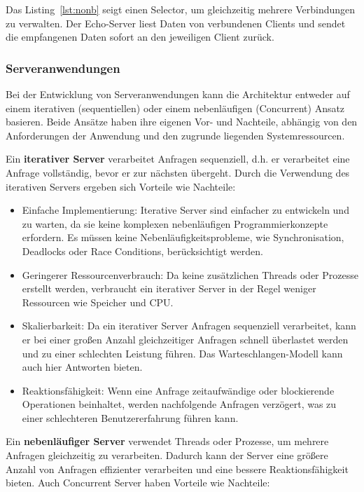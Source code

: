 \documentclass[../vs-script-first-v01.tex]{subfiles}
\begin{document}
Das Listing~\ref{lst:nonb} seigt einen Selector, um gleichzeitig mehrere Verbindungen zu verwalten. Der Echo-Server liest Daten von verbundenen Clients und sendet die empfangenen Daten sofort an den jeweiligen Client zurück.

\subsubsection{Serveranwendungen}
Bei der Entwicklung von Serveranwendungen kann die Architektur entweder auf einem iterativen (sequentiellen) oder einem nebenläufigen (Concurrent) Ansatz basieren. Beide Ansätze haben ihre eigenen Vor- und Nachteile, abhängig von den Anforderungen der Anwendung und den zugrunde liegenden Systemressourcen. 

Ein \textbf{iterativer Server} verarbeitet Anfragen sequenziell, d.h. er verarbeitet eine Anfrage vollständig, bevor er zur nächsten übergeht.  Durch die Verwendung des iterativen Servers ergeben sich Vorteile wie Nachteile:
\begin{itemize}
\item Einfache Implementierung: Iterative Server sind einfacher zu entwickeln und zu warten, da sie keine komplexen nebenläufigen Programmierkonzepte erfordern. Es müssen keine Nebenläufigkeitsprobleme, wie Synchronisation, Deadlocks oder Race Conditions, berücksichtigt werden.
\item Geringerer Ressourcenverbrauch: Da keine zusätzlichen Threads oder Prozesse erstellt werden, verbraucht ein iterativer Server in der Regel weniger Ressourcen wie Speicher und CPU.
\item Skalierbarkeit: Da ein iterativer Server Anfragen sequenziell verarbeitet, kann er bei einer großen Anzahl gleichzeitiger Anfragen schnell überlastet werden und zu einer schlechten Leistung führen. Das Warteschlangen-Modell kann auch hier Antworten bieten.
\item Reaktionsfähigkeit: Wenn eine Anfrage zeitaufwändige oder blockierende Operationen beinhaltet, werden nachfolgende Anfragen verzögert, was zu einer schlechteren Benutzererfahrung führen kann.
\end{itemize}
Ein \textbf{nebenläufiger Server} verwendet Threads oder Prozesse, um mehrere Anfragen gleichzeitig zu verarbeiten. Dadurch kann der Server eine größere Anzahl von Anfragen effizienter verarbeiten und eine bessere Reaktionsfähigkeit bieten. Auch Concurrent Server haben Vorteile wie Nachteile:
\end{document}
